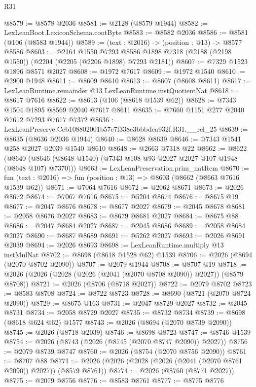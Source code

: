 \begin{lexlean}{R31}
\begin{coremodule}
@8579 := @8578 @2036
@8581 := @2128 (@8579 @1944)
@8582 := LexLeanBoot.LexiconSchema.contByte
@8583 := @8582 @2036
@8586 := @8581 (@106 (@8583 @1944))
@8589 := (text : @2016) -> (position : @13) -> @8577 @8586
@8603 := @2164
    @1550
    @7293
    @8586
    @1898
    @7318
    (@2188 (@2198 @1550))
    (@2204 (@2205 (@2206 @1898) @7293 @2181))
@8607 := @7329 @1523 @1896 @8571 @2027
@8608 := @1972 @7617
@8609 := @1972 @1540
@8610 := @2900 @1948
@8611 := @8609 @8610
@8613 := @8607 (@8608 @8611)
@8617 := LexLeanRuntime.remainder @13 LexLeanRuntime.instQuotientNat
@8618 := @8617 @7616
@8622 := @8613 (@106 (@8618 @1539 @62))
@8628 := @7343 @1504 @1895 @8569 @2040 @7617 @8611
@8635 := @7660 @1151 @277 @2040 @7612 @7293 @7617 @7372
@8636 := LexLeanPreserve.Ceb108802001b57e7f338e3bbbdea932f.R31.__rel_25
@8639 := @8635 (@8636 @2036 @1944)
@8640 := @8628 @8639
@8646 := @7343 @1541 @258 @2027 @2039 @1540 @8610
@8648 := @2663 @7318 @22
@8662 := @8622
    (@8640 (@8646 (@8648 @1540) (@7343 @108 @93 @2027 @2027 @107 @1948 (@8648 @107) @7370)))
@8663 := LexLeanPreservation.prim_natRem
@8670 := fun (text : @2016) => fun (position : @13) => @8603 (@8662 (@8663 @7616 @1539 @62))
@8671 := @7064 @7616
@8672 := @2062 @8671
@8673 := @2026 @8672
@8674 := @7067 @7616
@8675 := @5204 @8674
@8676 := @8675 @19
@8677 := @2047 @8676
@8678 := @8677 @2027
@8679 := @2045 @8678
@8681 := @2058 @8676 @2027
@8683 := @8679 @8681 @2027
@8684 := @8675 @88
@8686 := @2047 @8684 @2027
@8687 := @2045 @8686
@8689 := @2058 @8684 @2027
@8690 := @8687 @8689
@8691 := @5262 @2027
@8693 := @2026 @8691 @2039
@8694 := @2026 @8693
@8698 := LexLeanRuntime.multiply @13 instMulNat
@8702 := @8698 (@8618 @1528 @62) @1539
@8706 := @2026 (@8694 (@2070 @8702 @2090))
@8707 := @2079 @1944
@8708 := @8707 @19
@8718 := @2026 (@2026 (@2028 (@2026 (@2041 (@2070 @8708 @2090)) @2027)) (@8579 @8708))
@8721 := @2026 (@8706 (@8718 @2027))
@8722 := @2079 @8702
@8723 := @8583 @8708
@8724 := @8722 @8723
@8728 := @8690 (@8721 (@2070 @8724 @2090))
@8729 := @8675 @163
@8731 := @2047 @8729 @2027
@8732 := @2045 @8731
@8734 := @2058 @8729 @2027
@8735 := @8732 @8734
@8739 := @8698 (@8618 @624 @62) @1577
@8743 := @2026 (@8694 (@2070 @8739 @2090))
@8745 := @2026 (@8718 @2039)
@8746 := @8698 @8723
@8747 := @8746 @1539
@8754 := @2026 (@8743 (@2026 (@8745 (@2070 @8747 @2090)) @2027))
@8756 := @2079 @8739 @8747
@8760 := @2026 (@8754 (@2070 @8756 @2090))
@8761 := @8707 @88
@8771 := @2026 (@2026 (@2028 (@2026 (@2041 (@2070 @8761 @2090)) @2027)) (@8579 @8761))
@8774 := @2026 (@8760 (@8771 @2027))
@8775 := @2079 @8756
@8776 := @8583 @8761
@8777 := @8775 @8776

\end{coremodule}
\end{lexlean}
